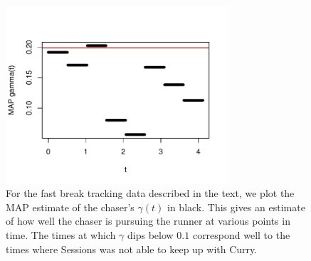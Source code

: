 \documentclass[graybox]{svmult}
\begin{document}
\begin{figure}
\vspace{-0.5in}
\begin{center}
\includegraphics[width=3.25in]{inferredgamma}
\end{center}
\vspace{-0.25in}
\caption{For the fast break tracking data described in the text, we
  plot the MAP estimate of the chaser's $\gamma(t)$ in black.  This gives
 an estimate of how well the chaser is pursuing the runner at various points
 in time.  The times at which $\gamma$ dips below $0.1$ correspond well to 
 the times where Sessions was not able to keep up with Curry.}
\label{fig:inferredgamma}
\end{figure}


\vspace{-0.25in}



\end{document}

